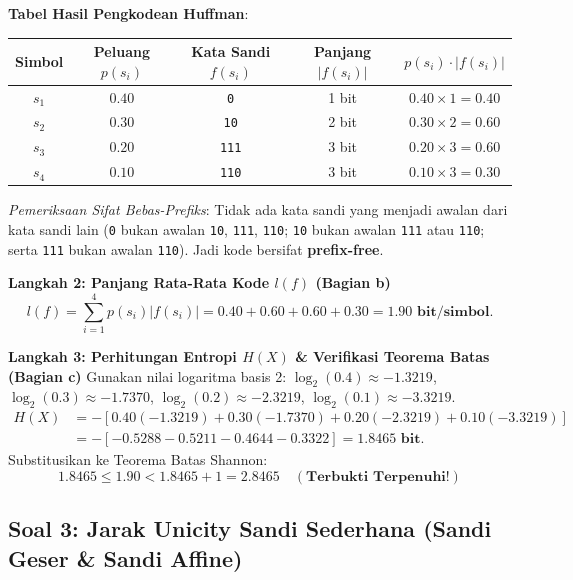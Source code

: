 \documentclass[11pt,a4paper]{article}
\begin{document}
\noindent\textbf{Tabel Hasil Pengkodean Huffman}:
\begin{center}
\begin{tabular}{ccccc}
\toprule
\textbf{Simbol} & \textbf{Peluang $p(s_i)$} & \textbf{Kata Sandi $f(s_i)$} & \textbf{Panjang $|f(s_i)|$} & $p(s_i) \cdot |f(s_i)|$ \\
\midrule
$s_1$ & $0.40$ & \texttt{0} & 1 bit & $0.40 \times 1 = 0.40$ \\
$s_2$ & $0.30$ & \texttt{10} & 2 bit & $0.30 \times 2 = 0.60$ \\
$s_3$ & $0.20$ & \texttt{111} & 3 bit & $0.20 \times 3 = 0.60$ \\
$s_4$ & $0.10$ & \texttt{110} & 3 bit & $0.10 \times 3 = 0.30$ \\
\bottomrule
\end{tabular}
\end{center}
\textit{Pemeriksaan Sifat Bebas-Prefiks}: Tidak ada kata sandi yang menjadi awalan dari kata sandi lain (\texttt{0} bukan awalan \texttt{10}, \texttt{111}, \texttt{110}; \texttt{10} bukan awalan \texttt{111} atau \texttt{110}; serta \texttt{111} bukan awalan \texttt{110}). Jadi kode bersifat \textbf{prefix-free}.

\noindent\textbf{Langkah 2: Panjang Rata-Rata Kode $l(f)$ (Bagian b)}
\[
l(f) = \sum_{i=1}^4 p(s_i)|f(s_i)| = 0.40 + 0.60 + 0.60 + 0.30 = \mathbf{1.90\text{ bit/simbol}}.
\]

\noindent\textbf{Langkah 3: Perhitungan Entropi $H(X)$ \& Verifikasi Teorema Batas (Bagian c)}
Gunakan nilai logaritma basis 2: $\log_2(0.4) \approx -1.3219$, $\log_2(0.3) \approx -1.7370$, $\log_2(0.2) \approx -2.3219$, $\log_2(0.1) \approx -3.3219$.
\begin{align*}
H(X) &= - \left[ 0.40(-1.3219) + 0.30(-1.7370) + 0.20(-2.3219) + 0.10(-3.3219) \right] \\
&= - \left[ -0.5288 - 0.5211 - 0.4644 - 0.3322 \right] = \mathbf{1.8465\text{ bit}}.
\end{align*}
Substitusikan ke Teorema Batas Shannon:
\[
1.8465 \le 1.90 < 1.8465 + 1 = 2.8465 \quad (\textbf{Terbukti Terpenuhi!})
\]

\vspace{0.4cm}

\subsection{Soal 3: Jarak Unicity Sandi Sederhana (Sandi Geser \& Sandi Affine)}
\end{document}
